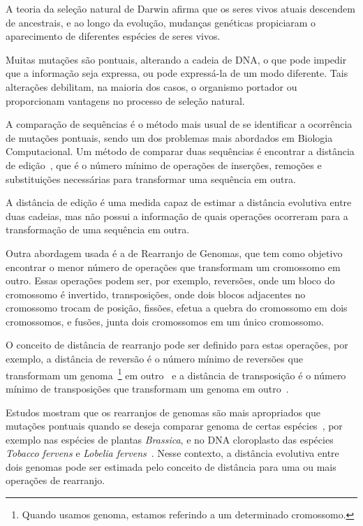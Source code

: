 A teoria da seleção natural de Darwin afirma que os seres vivos atuais
descendem de ancestrais, e ao longo da evolução, mudanças genéticas
propiciaram o aparecimento de diferentes espécies de seres vivos. 

Muitas mutações são pontuais, alterando a cadeia de DNA, o que pode
impedir que a informação seja expressa, ou pode expressá-la de um modo
diferente. Tais alterações debilitam, na maioria dos casos, o organismo
portador ou proporcionam vantagens no processo de seleção natural.

A comparação de sequências é o método mais usual de se identificar a
ocorrência de mutações pontuais, sendo um dos problemas mais abordados
em Biologia Computacional. Um método de comparar duas sequências é
encontrar a distância de edição~\cite{SetubalMeidanis*1997}, que é o
número mínimo de operações de inserções, remoções e substituições
necessárias para transformar uma sequência em outra. 

A distância de edição é uma medida capaz de estimar a distância
evolutiva entre duas cadeias, mas não possui a informação de quais
operações ocorreram para a transformação de uma sequência em outra.

Outra abordagem usada é a de Rearranjo de Genomas, que tem como objetivo
encontrar o menor número de operações que transformam um cromossomo em
outro. Essas operações podem ser, por exemplo, reversões, onde um bloco
do cromossomo é invertido, transposições, onde dois blocos adjacentes no
cromossomo trocam de posição, fissões, efetua a quebra do cromossomo em
dois cromossomos, e fusões, junta dois cromossomos em um único
cromossomo.

O conceito de distância de rearranjo pode ser definido para estas
operações, por exemplo, a distância de reversão é o número mínimo de
reversões que transformam um genoma~\footnote{Quando usamos genoma,
estamos referindo a um determinado cromossomo.} em
outro~\cite{BafnaPevzner*1996} e a distância de transposição é o número
mínimo de transposições que transformam um genoma em
outro~\cite{BafnaPevzner*1998}. 

Estudos mostram que os rearranjos de genomas são mais apropriados que
mutações pontuais quando se deseja comparar genoma de certas
espécies~\cite{PalmerHerbon*1988}, por exemplo nas espécies de plantas
\textit{Brassica}, e no DNA cloroplasto das espécies \textit{Tobacco
fervens} e \textit{Lobelia fervens}~\cite{BafnaPevzner*1996}. Nesse
contexto, a distância evolutiva entre dois genomas pode ser estimada
pelo conceito de distância para uma ou mais operações de rearranjo.

